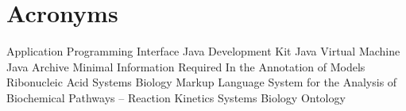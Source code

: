 \chapter{Acronyms}
\begin{acronym}
        {Application Programming Interface}
        {Java\texttrademark{} Development Kit}
        {Java\texttrademark{} Virtual Machine}
        {Java\texttrademark{} Archive}
     {Minimal Information Required In the Annotation of Models}
        {Ribonucleic Acid}
       {Systems Biology Markup Language}
   {System for the Analysis of Biochemical Pathways -- Reaction Kinetics}
        {Systems Biology Ontology}
\end{acronym}

